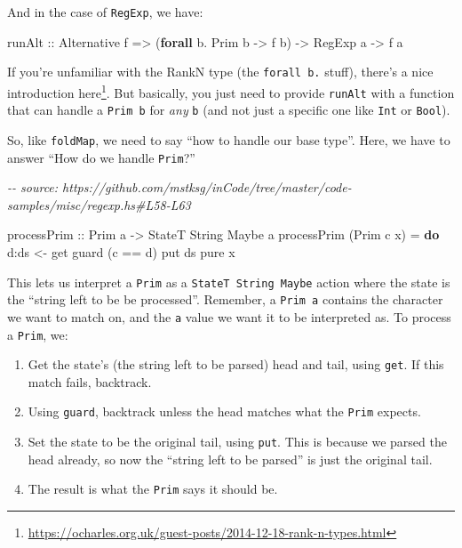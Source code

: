 \documentclass[]{article}
\newenvironment{Shaded}{}{}
\newcommand{\CommentTok}[1]{\textcolor[rgb]{0.38,0.63,0.69}{\textit{#1}}}
\newcommand{\DataTypeTok}[1]{\textcolor[rgb]{0.56,0.13,0.00}{#1}}
\newcommand{\FunctionTok}[1]{\textcolor[rgb]{0.02,0.16,0.49}{#1}}
\newcommand{\KeywordTok}[1]{\textcolor[rgb]{0.00,0.44,0.13}{\textbf{#1}}}
\newcommand{\NormalTok}[1]{#1}
\newcommand{\OperatorTok}[1]{\textcolor[rgb]{0.40,0.40,0.40}{#1}}
\newcommand{\OtherTok}[1]{\textcolor[rgb]{0.00,0.44,0.13}{#1}}
\renewcommand{\href}[2]{#2\footnote{\url{#1}}}
\begin{document}
And in the case of \texttt{RegExp}, we have:

\begin{Shaded}
\begin{Highlighting}[]
\OtherTok{runAlt ::} \DataTypeTok{Alternative}\NormalTok{ f}
       \OtherTok{=\textgreater{}}\NormalTok{ (}\KeywordTok{forall}\NormalTok{ b}\OperatorTok{.} \DataTypeTok{Prim}\NormalTok{ b }\OtherTok{{-}\textgreater{}}\NormalTok{ f b)}
       \OtherTok{{-}\textgreater{}} \DataTypeTok{RegExp}\NormalTok{ a}
       \OtherTok{{-}\textgreater{}}\NormalTok{ f a}
\end{Highlighting}
\end{Shaded}

If you're unfamiliar with the RankN type (the \texttt{forall\ b.} stuff),
there's a
\href{https://ocharles.org.uk/guest-posts/2014-12-18-rank-n-types.html}{nice
introduction here}. But basically, you just need to provide \texttt{runAlt} with
a function that can handle a \texttt{Prim\ b} for \emph{any} \texttt{b} (and not
just a specific one like \texttt{Int} or \texttt{Bool}).

So, like \texttt{foldMap}, we need to say ``how to handle our base type''. Here,
we have to answer ``How do we handle \texttt{Prim}?''

\begin{Shaded}
\begin{Highlighting}[]
\CommentTok{{-}{-} source: https://github.com/mstksg/inCode/tree/master/code{-}samples/misc/regexp.hs\#L58{-}L63}

\OtherTok{processPrim ::} \DataTypeTok{Prim}\NormalTok{ a }\OtherTok{{-}\textgreater{}} \DataTypeTok{StateT} \DataTypeTok{String} \DataTypeTok{Maybe}\NormalTok{ a}
\NormalTok{processPrim (}\DataTypeTok{Prim}\NormalTok{ c x) }\OtherTok{=} \KeywordTok{do}
\NormalTok{    d}\OperatorTok{:}\NormalTok{ds }\OtherTok{\textless{}{-}}\NormalTok{ get}
\NormalTok{    guard (c }\OperatorTok{==}\NormalTok{ d)}
\NormalTok{    put ds}
    \FunctionTok{pure}\NormalTok{ x}
\end{Highlighting}
\end{Shaded}

This lets us interpret a \texttt{Prim} as a \texttt{StateT\ String\ Maybe}
action where the state is the ``string left to be be processed''. Remember, a
\texttt{Prim\ a} contains the character we want to match on, and the \texttt{a}
value we want it to be interpreted as. To process a \texttt{Prim}, we:

\begin{enumerate}
\def\labelenumi{\arabic{enumi}.}
\tightlist
\item
  Get the state's (the string left to be parsed) head and tail, using
  \texttt{get}. If this match fails, backtrack.
\item
  Using \texttt{guard}, backtrack unless the head matches what the \texttt{Prim}
  expects.
\item
  Set the state to be the original tail, using \texttt{put}. This is because we
  parsed the head already, so now the ``string left to be parsed'' is just the
  original tail.
\item
  The result is what the \texttt{Prim} says it should be.
\end{enumerate}
\end{document}
